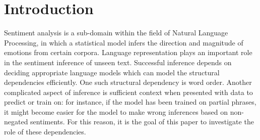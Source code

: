 \section{Introduction}
\label{sec: intro}
Sentiment analysis is a sub-domain within the field of Natural Language
Processing, in which a statistical model infers the direction and magnitude of
emotions from certain corpora. Language representation plays an important role
in the sentiment inference of unseen text. Successful inference depends on
deciding appropriate language models which can model the structural dependencies
efficiently. One such structural dependency is word order. Another complicated
aspect of inference is sufficient context when presented with data to predict or
train on: for instance, if the model has been trained on partial phrases, it
might become easier for the model to make wrong inferences based on non-negated
sentiments. For this reason, it is the goal of this paper to investigate the
role of these dependencies.

